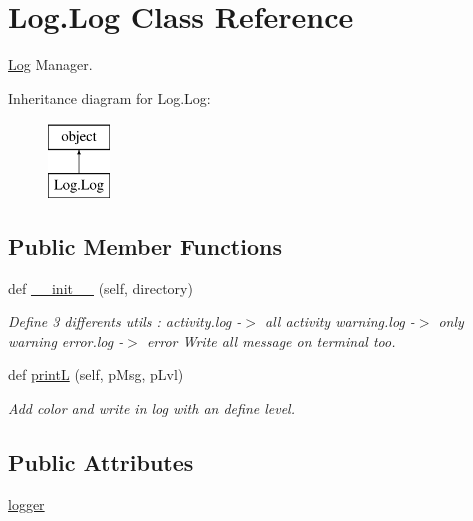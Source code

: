 \hypertarget{class_log_1_1_log}{}\section{Log.\+Log Class Reference}
\label{class_log_1_1_log}


\hyperlink{class_log_1_1_log}{Log} Manager.  


Inheritance diagram for Log.\+Log\+:\begin{figure}[H]
\begin{center}
\leavevmode
\includegraphics[height=2.000000cm]{class_log_1_1_log}
\end{center}
\end{figure}
\subsection*{Public Member Functions}
\begin{DoxyCompactItemize}
\item 
def \hyperlink{class_log_1_1_log_a67d345cd00f8aa2bccf5a1229b977a94}{\+\_\+\+\_\+init\+\_\+\+\_\+} (self, directory)
\begin{DoxyCompactList}\small\item\em Define 3 differents utils \+: activity.\+log -\/$>$ all activity warning.\+log -\/$>$ only warning error.\+log -\/$>$ error Write all message on terminal too. \end{DoxyCompactList}\item 
def \hyperlink{class_log_1_1_log_ab727696e7af3c67698082458215c2778}{print\+L} (self, p\+Msg, p\+Lvl)
\begin{DoxyCompactList}\small\item\em Add color and write in log with an define level. \end{DoxyCompactList}\end{DoxyCompactItemize}
\subsection*{Public Attributes}
\begin{DoxyCompactItemize}
\item 
\hyperlink{class_log_1_1_log_a0389e51ebd116d483b2b8e662bbcdf09}{logger}
\end{DoxyCompactItemize}


